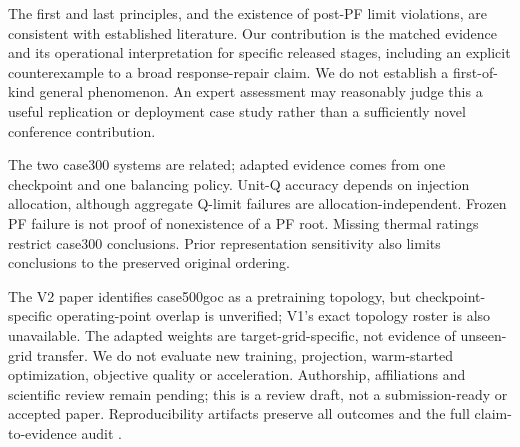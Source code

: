 \documentclass[conference,letterpaper]{IEEEtran}
\begin{document}
The first and last principles, and the existence of post-PF limit violations, are consistent with established literature. Our contribution is the matched evidence and its operational interpretation for specific released stages, including an explicit counterexample to a broad response-repair claim. We do not establish a first-of-kind general phenomenon. An expert assessment may reasonably judge this a useful replication or deployment case study rather than a sufficiently novel conference contribution.

The two case300 systems are related; adapted evidence comes from one checkpoint and one balancing policy. Unit-Q accuracy depends on injection allocation, although aggregate Q-limit failures are allocation-independent. Frozen PF failure is not proof of nonexistence of a PF root. Missing thermal ratings restrict case300 conclusions. Prior representation sensitivity also limits conclusions to the preserved original ordering.

The V2 paper identifies case500goc as a pretraining topology, but checkpoint-specific operating-point overlap is unverified; V1's exact topology roster is also unavailable. The adapted weights are target-grid-specific, not evidence of unseen-grid transfer. We do not evaluate new training, projection, warm-started optimization, objective quality or acceleration. Authorship, affiliations and scientific review remain pending; this is a review draft, not a submission-ready or accepted paper. Reproducibility artifacts preserve all outcomes and the full claim-to-evidence audit \cite{artifacts}.



\end{document}
